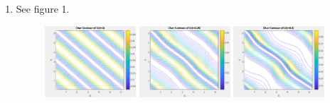 \documentclass{article}
\begin{document}
\begin{enumerate}[label=\alph*)]
\begin{proof}
\begin{align*}
            &= \frac{1}{4\pi^2}\int_0^{2\pi}\int_0^{2\pi}1 - \cos(2x+2y)dxdy\\
            &= \frac{1}{4\pi^2}\left(4\pi^2 -
            \int_0^{2\pi}\int_0^{2\pi}\cos(2x+2y)dxdy\right)\\
            &= 1 - \frac{1}{4\pi^2}\int_0^{2\pi}\int_0^{2\pi}\cos(2x+2y)dxdy\\
            &= 1 - \frac{1}{4\pi^2}\int_0^{2\pi}0dx\\
            &= 1
        \end{align*}
        Thus we have that U will satisfy this integral at every timestep.
    \end{proof}
    
    \item See figure 1.
    \begin{figure}
        \centering
            \includegraphics[width=0.32\textwidth]{t0charcontour.png}
            \includegraphics[width=0.32\textwidth]{t25charcontour.png}
            \includegraphics[width=0.32\textwidth]{t5charcontour.png}
        \emp


\end{figure}
\end{enumerate}
\end{document}
